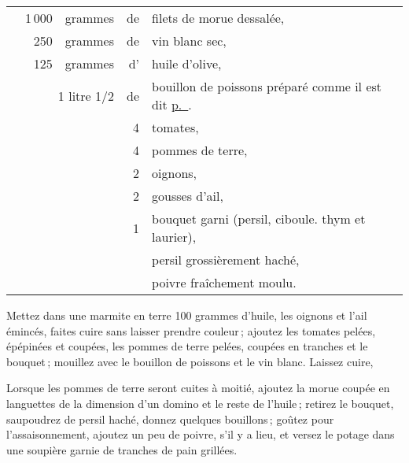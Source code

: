 \footnotesize
\begin{longtable}{rrrrp{16em}}   
  & 1 000 & grammes     & de & filets de morue dessalée,                                                  \\
  &   250 & grammes     & de & vin blanc sec,                                                             \\
  &   125 & grammes     & d' & huile d'olive,                                                             \\
  & \multicolumn{2}{r}{1 litre 1/2}   & de & bouillon de poissons préparé comme 
                                             il est dit \hyperlink{p0218}{p. \pageref{pg0218}}.           \\
  &       &             &  4 & tomates,                                                                   \\
  &       &             &  4 & pommes de terre,                                                           \\
  &       &             &  2 & oignons,                                                                   \\
  &       &             &  2 & gousses d'ail,                                                             \\
  &       &             &  1 & bouquet garni (persil, ciboule. thym et laurier),                          \\
  &       &             &    & persil grossièrement haché,                                                \\
  &       &             &    & poivre fraîchement moulu.                                                  \\
\end{longtable}
\normalsize                        

Mettez dans une marmite en terre 100 grammes d'huile, les oignons et l'ail
émincés, faites cuire sans laisser prendre couleur ; ajoutez les tomates
pelées, épépinées et coupées, les pommes de terre pelées, coupées en tranches
et le bouquet ; mouillez avec le bouillon de poissons et le vin blanc. Laissez
cuire,

Lorsque les pommes de terre seront cuites à moitié, ajoutez la morue coupée en
languettes de la dimension d'un domino et le reste de l'huile ; retirez le
bouquet, saupoudrez de persil haché, donnez quelques bouillons ; goûtez pour
l’assaisonnement, ajoutez un peu de poivre, s'il y a lieu, et versez le potage
dans une soupière garnie de tranches de pain grillées.

